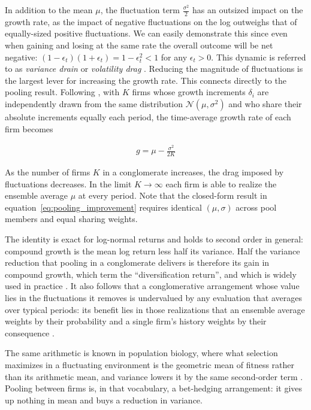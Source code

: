 \documentclass[12pt,a4paper]{article}
\begin{document}
In addition to the mean $\mu$, the fluctuation term $\frac{\sigma^2}{2}$ has an outsized impact on the growth rate, as the impact of negative fluctuations on the log outweighs that of equally-sized positive fluctuations. We can easily demonstrate this since even when gaining and losing at the same rate the overall outcome will be net negative: $(1 - \epsilon_t)(1 + \epsilon_t) = 1 - \epsilon_t^2 < 1$ for any $\epsilon_t > 0$. This dynamic is referred to as \textit{variance drain} \parencite{messmore1995variance} or \textit{volatility drag} \parencite{spitznagel2021safe}. Reducing the magnitude of fluctuations is the largest lever for increasing the growth rate. 
This connects directly to the pooling result. Following \textcite{peters2022ergodicity}, with $K$ firms whose growth increments $\delta_i$ are independently drawn from the same distribution $\mathcal{N}(\mu, \sigma^2)$ and who share their absolute increments equally each period, the time-average growth rate of each firm becomes

\begin{gather}
    \label{eq:pooling_improvement}
    g = \mu - \frac{\sigma^2}{2K}
\end{gather}

As the number of firms $K$ in a conglomerate increases, the drag imposed by fluctuations decreases. In the limit $K \to \infty$ each firm is able to realize the ensemble average $\mu$ at every period. Note that the closed-form result in equation~\ref{eq:pooling_improvement} requires identical $(\mu, \sigma)$ across pool members and equal sharing weights. 

The identity is exact for log-normal returns and holds to second order in general: compound growth is the mean log return less half its variance. Half the variance reduction that pooling in a conglomerate delivers is therefore its gain in compound growth, which \textcite{booth1992diversification} term the ``diversification return'', and which is widely used in practice \parencite{erb2006strategic}. It also follows that a conglomerative arrangement whose value lies in the fluctuations it removes is undervalued by any evaluation that averages over typical periods:
its benefit lies in those realizations that an ensemble average weights by their probability and a single firm's history weights by their consequence \parencite{peters2019ergodicity}.

The same arithmetic is known in population biology, where what selection maximizes in a fluctuating environment is the geometric mean of fitness rather than its arithmetic mean, and variance lowers it by the same second-order term \parencite{lewontin1969population, gillespie1974natural}. Pooling between firms is, in that vocabulary, a bet-hedging arrangement: it gives up nothing in mean and buys a reduction in variance.
\end{document}
